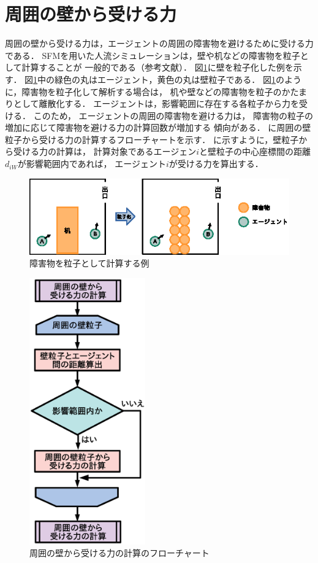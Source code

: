 \section{周囲の壁から受ける力}
周囲の壁から受ける力は，エージェントの周囲の障害物を避けるために受ける力である．
SFMを用いた人流シミュレーションは，壁や机などの障害物を粒子として計算することが
一般的である（参考文献）．
図\ref{fig:kaberyuusi_ex}に壁を粒子化した例を示す．
図\ref{fig:kaberyuusi_ex}中の緑色の丸はエージェント，黄色の丸は壁粒子である．
図\ref{fig:kaberyuusi_ex}のように，障害物を粒子化して解析する場合は，
机や壁などの障害物を粒子のかたまりとして離散化する．
エージェントは，影響範囲に存在する各粒子から力を受ける．
このため，
エージェントの周囲の障害物を避ける力は，
障害物の粒子の増加に応じて障害物を避ける力の計算回数が増加する
傾向がある．
に周囲の壁粒子から受ける力の計算するフローチャートを示す．
に示すように，壁粒子から受ける力の計算は，
計算対象であるエージェン$i$と壁粒子の中心座標間の距離$d_{iW}$が影響範囲内であれば，
エージェント$i$が受ける力を算出する．


\begin{figure}[t]
 \begin{center}
  \includegraphics[width=11.5cm,clip]{figure/shougaibutu_ryuusika.eps}
  \caption{障害物を粒子として計算する例}
  \label{fig:kaberyuusi_ex}
 \end{center}
\end{figure}


\begin{figure}[t]
 \begin{center}
  \includegraphics[width=5cm,clip]{figure/kabe_flow.eps}
  \caption{周囲の壁から受ける力の計算のフローチャート}
  \label{fig:kabe_flowchart}
 \end{center}
\end{figure}

